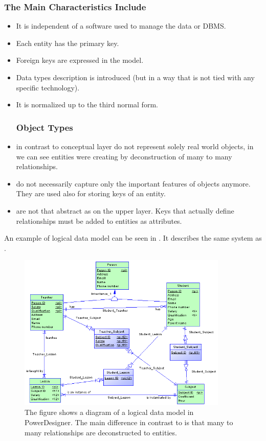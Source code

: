 \subsubsection{The Main Characteristics Include}
\begin{itemize}
	\item It is independent of a software used to manage the data or DBMS.
	\item Each entity has the primary key.
	\item Foreign keys are expressed in the model.
	\item Data types description is introduced (but in a way that is not tied with any specific technology).
	\item It is normalized up to the third normal form.
	\subsubsection{Object Types}
	\item {} in contrast to conceptual layer do not represent solely real world objects, in  we can see entities were creating by deconstruction of many to many relationships.
	\item {} do not necessarily capture only the important features of objects anymore. They are used also for storing keys of an entity.
	\item {} are not that abstract as on the upper layer. Keys that actually define relationships must be added to entities as attributes.
\end{itemize}

An example of logical data model can be seen in . It describes the same system as .

\begin{figure}[H]
	\centering
	\includegraphics[width=10cm]{../img/Logical_Model_PowerDesigner}
	\caption[Logical diagram\cite{PowerDesignerDocumentation}s]{ The figure shows a diagram of a logical data model in PowerDesigner. The main difference in contrast to  is that many to many relationships are deconstructed to entities.}
	\label{LDM}
\end{figure}

